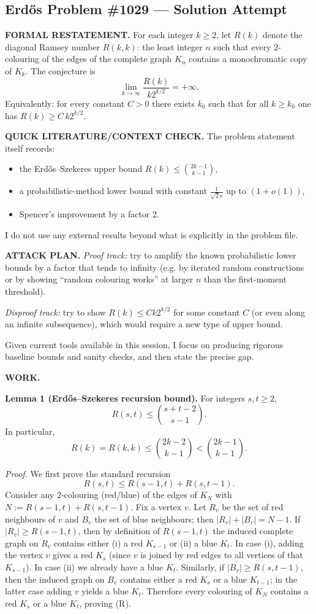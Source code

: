 \subsection*{Erd\H{o}s Problem \#1029 --- Solution Attempt}

\textbf{FORMAL RESTATEMENT.}
For each integer $k\ge 2$, let $R(k)$ denote the diagonal Ramsey number $R(k,k)$: the least integer $n$ such that every 2-colouring of the edges of the complete graph $K_n$ contains a monochromatic copy of $K_k$.
The conjecture is
\[
\lim_{k\to\infty} \frac{R(k)}{k2^{k/2}} = +\infty.
\]
Equivalently: for every constant $C>0$ there exists $k_0$ such that for all $k\ge k_0$ one has $R(k)\ge C\,k2^{k/2}$.

\textbf{QUICK LITERATURE/CONTEXT CHECK.}
The problem statement itself records:
\begin{itemize}
\item the Erd\H{o}s--Szekeres upper bound $R(k)\le \binom{2k-1}{k-1}$,
\item a probabilistic-method lower bound with constant $\frac{1}{\sqrt{2}e}$ up to $(1+o(1))$,
\item Spencer's improvement by a factor $2$.
\end{itemize}
I do not use any external results beyond what is explicitly in the problem file.

\textbf{ATTACK PLAN.}
\emph{Proof track:} try to amplify the known probabilistic lower bounds by a factor that tends to infinity (e.g. by iterated random constructions or by showing ``random colouring works'' at larger $n$ than the first-moment threshold).

\emph{Disproof track:} try to show $R(k)\le Ck2^{k/2}$ for some constant $C$ (or even along an infinite subsequence), which would require a new type of upper bound.

Given current tools available in this session, I focus on producing rigorous baseline bounds and sanity checks, and then state the precise gap.

\textbf{WORK.}

\textbf{Lemma 1 (Erd\H{o}s--Szekeres recursion bound).}
For integers $s,t\ge 2$,
\[
R(s,t) \le \binom{s+t-2}{s-1}.
\]
In particular,
\[
R(k)=R(k,k) \le \binom{2k-2}{k-1} < \binom{2k-1}{k-1}.
\]

\emph{Proof.}
We first prove the standard recursion
\[
R(s,t) \le R(s-1,t) + R(s,t-1). \tag{R}
\]
Consider any 2-colouring (red/blue) of the edges of $K_N$ with
$N := R(s-1,t)+R(s,t-1)$.
Fix a vertex $v$. Let $R_v$ be the set of red neighbours of $v$ and $B_v$ the set of blue neighbours; then
$|R_v|+|B_v|=N-1$.
If $|R_v|\ge R(s-1,t)$, then by definition of $R(s-1,t)$ the induced complete graph on $R_v$ contains either
(i) a red $K_{s-1}$ or (ii) a blue $K_t$.
In case (i), adding the vertex $v$ gives a red $K_s$ (since $v$ is joined by red edges to all vertices of that $K_{s-1}$).
In case (ii) we already have a blue $K_t$.
Similarly, if $|B_v|\ge R(s,t-1)$, then the induced graph on $B_v$ contains either a red $K_s$ or a blue $K_{t-1}$; in the latter case adding $v$ yields a blue $K_t$.
Therefore every colouring of $K_N$ contains a red $K_s$ or a blue $K_t$, proving (R).

